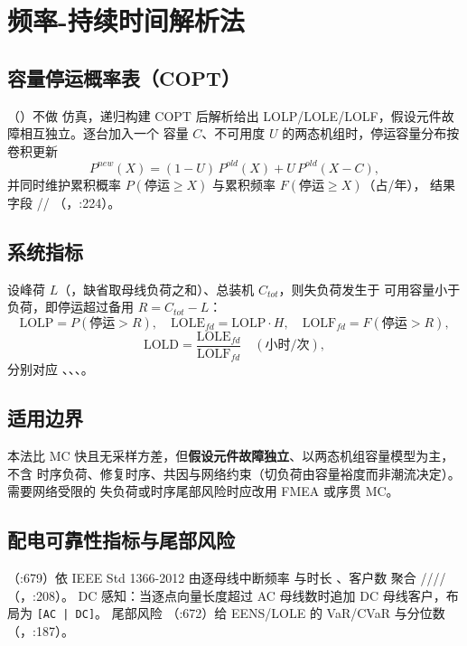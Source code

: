 \section{频率-持续时间解析法}\label{sec:rel-fd}

\subsection{容量停运概率表（COPT）}
（）不做
仿真，递归构建 COPT 后解析给出 LOLP/LOLE/LOLF，假设元件故障相互独立。逐台加入一个
容量 $C$、不可用度 $U$ 的两态机组时，停运容量分布按卷积更新
\begin{equation}
P^{new}(X)=(1-U)\,P^{old}(X)+U\,P^{old}(X-C),
\end{equation}
并同时维护累积概率 $P(\text{停运}\ge X)$ 与累积频率 $F(\text{停运}\ge X)$（占/年），
结果字段 //
（，:224）。

\subsection{系统指标}
设峰荷 $L$（，缺省取母线负荷之和）、总装机 $C_{tot}$，则失负荷发生于
可用容量小于负荷，即停运超过备用 $R=C_{tot}-L$：
\begin{equation}
\mathrm{LOLP}=P(\text{停运}>R),\quad
\mathrm{LOLE}_{fd}=\mathrm{LOLP}\cdot H,\quad
\mathrm{LOLF}_{fd}=F(\text{停运}>R),
\end{equation}
\begin{equation}
\mathrm{LOLD}=\frac{\mathrm{LOLE}_{fd}}{\mathrm{LOLF}_{fd}}\quad(\text{小时/次}),
\end{equation}
分别对应 、、、。

\subsection{适用边界}
本法比 MC 快且无采样方差，但\textbf{假设元件故障独立}、以两态机组容量模型为主，不含
时序负荷、修复时序、共因与网络约束（切负荷由容量裕度而非潮流决定）。需要网络受限的
失负荷或时序尾部风险时应改用 FMEA 或序贯 MC。

\subsection{配电可靠性指标与尾部风险}
（:679）依 IEEE Std 1366-2012 由逐母线中断频率
 与时长 、客户数  聚合
////（，:208）。
DC 感知：当逐点向量长度超过 AC 母线数时追加 DC 母线客户，布局为 \texttt{[AC | DC]}。
尾部风险 （:672）给 EENS/LOLE 的 VaR/CVaR 与分位数
（，:187）。
